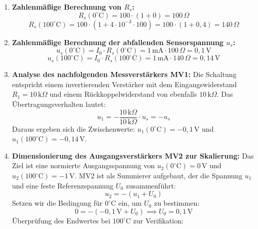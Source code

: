 \documentclass[11pt,a4paper]{article}
\begin{document}
\begin{enumerate}
    \item \textbf{Zahlenmäßige Berechnung von $R_s$:}
    \begin{equation}
    R_s(0^\circ\text{C}) = 100 \cdot (1 + 0) = 100\,\Omega
    \end{equation}
    \begin{equation}
    R_s(100^\circ\text{C}) = 100 \cdot (1 + 4 \cdot 10^{-3} \cdot 100) = 100 \cdot (1 + 0{,}4) = 140\,\Omega
    \end{equation}
    \item \textbf{Zahlenmäßige Berechnung der abfallenden Sensorspannung $u_s$:}
    \begin{equation}
    u_s(0^\circ\text{C}) = I_0 \cdot R_s(0^\circ\text{C}) = 1\,\text{mA} \cdot 100\,\Omega = 0{,}1\,\text{V}
    \end{equation}
    \begin{equation}
    u_s(100^\circ\text{C}) = I_0 \cdot R_s(100^\circ\text{C}) = 1\,\text{mA} \cdot 140\,\Omega = 0{,}14\,\text{V}
    \end{equation}
    \item \textbf{Analyse des nachfolgenden Messverstärkers MV1:}
    Die Schaltung entspricht einem invertierenden Verstärker mit dem Eingangswiderstand $R_1 = 10\,\text{k}\Omega$ und einem Rückkoppelwiderstand von ebenfalls $10\,\text{k}\Omega$. Das Übertragungsverhalten lautet:
    \begin{equation}
    u_1 = -\frac{10\,\text{k}\Omega}{10\,\text{k}\Omega} \cdot u_s = -u_s
    \end{equation}
    Daraus ergeben sich die Zwischenwerte: $u_1(0^\circ\text{C}) = -0{,}1\,\text{V}$ und $u_1(100^\circ\text{C}) = -0{,}14\,\text{V}$.
    \item \textbf{Dimensionierung des Ausgangsverstärkers MV2 zur Skalierung:}
    Das Ziel ist eine normierte Ausgangsspannung von $u_2(0^\circ\text{C}) = 0\,\text{V}$ und $u_2(100^\circ\text{C}) = -1\,\text{V}$. MV2 ist als Summierer aufgebaut, der die Spannung $u_1$ und eine feste Referenzspannung $U_0$ zusammenführt:
    \begin{equation}
    u_2 = -\left( u_1 + U_0 \right)
    \end{equation}
    Setzen wir die Bedingung für $0^\circ\text{C}$ ein, um $U_0$ zu bestimmen:
    \begin{equation}
    0 = -\left( -0{,}1\,\text{V} + U_0 \right) \implies U_0 = 0{,}1\,\text{V}
    \end{equation}
    Überprüfung des Endwertes bei $100^\circ\text{C}$ zur Verifikation:

\end{enumerate}
\end{document}
